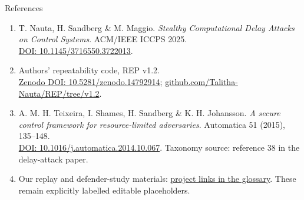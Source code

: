 \documentclass[8pt,aspectratio=169]{beamer}
\gdef\CPSOrigin{PAPER}%
\gdef\CPSSourceContext{}%
\begin{document}
\begin{frame}{References}
\gdef\CPSSourceContext{}
\gdef\CPSOrigin{SOURCES}
\small
\begin{enumerate}\setlength\itemsep{1em}
\item T. Nauta, H. Sandberg \& M. Maggio. \emph{Stealthy Computational Delay Attacks on Control Systems}. ACM/IEEE ICCPS 2025.\\
\href{https://doi.org/10.1145/3716550.3722013}{DOI: 10.1145/3716550.3722013}.
\item Authors' repeatability code, REP v1.2.\\
\href{https://doi.org/10.5281/zenodo.14792914}{Zenodo DOI: 10.5281/zenodo.14792914};
\href{https://github.com/Talitha-Nauta/REP/tree/v1.2}{github.com/Talitha-Nauta/REP/tree/v1.2}.
\item A. M. H. Teixeira, I. Shames, H. Sandberg \& K. H. Johansson. \emph{A secure control framework for resource-limited adversaries}. Automatica 51 (2015), 135--148.\\
\href{https://doi.org/10.1016/j.automatica.2014.10.067}{DOI: 10.1016/j.automatica.2014.10.067}. Taxonomy source: reference 38 in the delay-attack paper.
\item Our replay and defender-study materials: \hyperlink{cps-glossary-links}{project links in the glossary}. These remain explicitly labelled editable placeholders.
\end{enumerate}
\end{frame}
\endgroup
\end{document}
